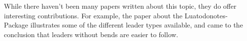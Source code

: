 \documentclass[11pt,a4paper]{article}
\begin{document}
While there haven't been many papers written about this topic, they do offer interesting contributions. For example, the paper\cite{Kindermann2014} about the Luatodonotes-Package illustrates some of the different leader types available, and came to the conclusion that leaders without bends are easier to follow. %







\end{document}
